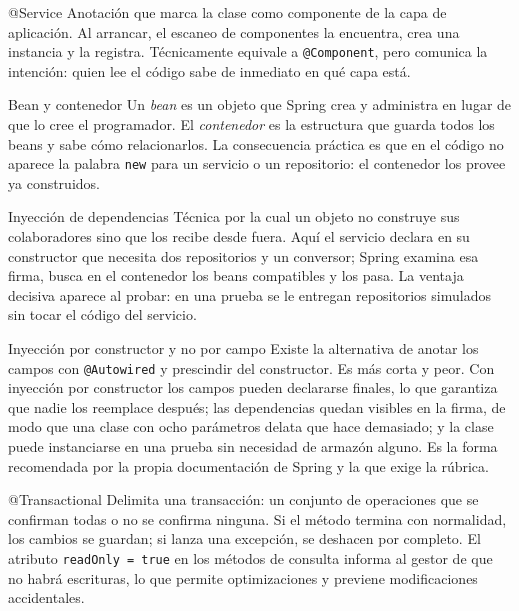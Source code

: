 \documentclass[11pt,a4paper,openany]{book}
\begin{document}
\begin{cajadefinicion}{@Service}
	Anotación que marca la clase como componente de la capa de aplicación. Al arrancar, el escaneo de componentes la encuentra, crea una instancia y la registra. Técnicamente equivale a \texttt{@Component}, pero comunica la intención: quien lee el código sabe de inmediato en qué capa está.
\end{cajadefinicion}

\begin{cajadefinicion}{Bean y contenedor}
	Un \emph{bean} es un objeto que Spring crea y administra en lugar de que lo cree el programador. El \emph{contenedor} es la estructura que guarda todos los beans y sabe cómo relacionarlos. La consecuencia práctica es que en el código no aparece la palabra \texttt{new} para un servicio o un repositorio: el contenedor los provee ya construidos.
\end{cajadefinicion}

\begin{cajadefinicion}{Inyección de dependencias}
	Técnica por la cual un objeto no construye sus colaboradores sino que los recibe desde fuera. Aquí el servicio declara en su constructor que necesita dos repositorios y un conversor; Spring examina esa firma, busca en el contenedor los beans compatibles y los pasa. La ventaja decisiva aparece al probar: en una prueba se le entregan repositorios simulados sin tocar el código del servicio.
\end{cajadefinicion}

\begin{cajabuenas}{Inyección por constructor y no por campo}
	Existe la alternativa de anotar los campos con \texttt{@Autowired} y prescindir del constructor. Es más corta y peor. Con inyección por constructor los campos pueden declararse finales, lo que garantiza que nadie los reemplace después; las dependencias quedan visibles en la firma, de modo que una clase con ocho parámetros delata que hace demasiado; y la clase puede instanciarse en una prueba sin necesidad de armazón alguno. Es la forma recomendada por la propia documentación de Spring y la que exige la rúbrica.
\end{cajabuenas}

\begin{cajadefinicion}{@Transactional}
	Delimita una transacción: un conjunto de operaciones que se confirman todas o no se confirma ninguna. Si el método termina con normalidad, los cambios se guardan; si lanza una excepción, se deshacen por completo. El atributo \texttt{readOnly = true} en los métodos de consulta informa al gestor de que no habrá escrituras, lo que permite optimizaciones y previene modificaciones accidentales.
\end{cajadefinicion}
\end{document}
